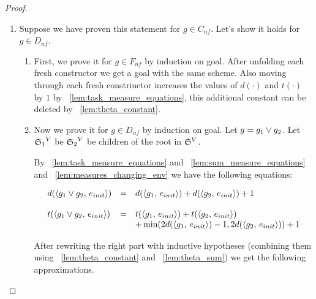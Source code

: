 \begin{proof}
$ $\newline
\begin{enumerate}
\item Suppose we have proven this statement for $g \in C_{nf}$. Let's show it holds for $g \in D_{nf}$.
	\begin{enumerate}
	\item First, we prove it for  $g \in F_{nf}$ by induction on goal.
	After unfolding each fresh constructor we get a goal with the same scheme.	
	Also moving through each fresh constriuctor increases the values of $d(\cdot)$ and $t(\cdot)$ by $1$ by \lemmaword~\ref{lem:task_measure_equations}, this additional constant can be deleted by \lemmaword~\ref{lem:theta_constant}.
	
	\item Now we prove it for $g \in D_{nf}$ by induction on goal. Let $g = g_1 \lor g_2$. Let ${\mathfrak{S}_1}^{V}$ be ${\mathfrak{S}_2}^{V}$ be children of the root in ${\mathfrak{S}}^{V}$.
		
	By \lemmaword~\ref{lem:task_measure_equations} and \lemmaword~\ref{lem:sum_measure_equations} and \lemmaword~\ref{lem:measures_changing_env} we have the following equations:

    \[ \begin{array}{lcl}
	d(\langle g_1 \lor g_2 ,\, e_{init} \rangle) &=& d(\langle g_1 ,\, e_{init} \rangle) + d(\langle g_2 ,\, e_{init} \rangle) + 1 \\
	\\
	t(\langle g_1 \lor g_2 ,\, e_{init} \rangle) &=& t(\langle g_1 ,\, e_{init} \rangle) + t(\langle g_2 ,\, e_{init} \rangle) \\
	&& + \min(2 d(\langle g_1 ,\, e_{init} \rangle) - 1, 2 d(\langle g_2 ,\, e_{init} \rangle)) + 1
	\end{array} \]
	
	After rewriting the right part with inductive hypotheses (combining them using \lemmaword~\ref{lem:theta_constant} and \lemmaword~\ref{lem:theta_sum}) we get the following approximations.
	

\end{enumerate}
\end{enumerate}
\end{proof}
